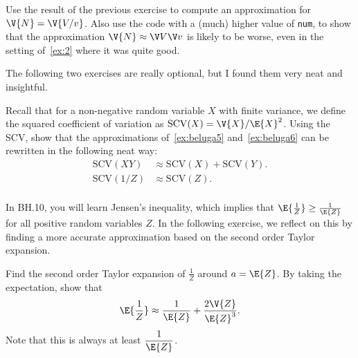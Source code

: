 \begin{exercise} Use the result of the previous exercise to compute an approximation for $\V {N}  = \V {V/v}$. Also use the code with a (much) higher value of \texttt{num}, to show that the approximation $\V {N}  \approx \V V \V v$ is likely to be worse, even in the setting of~\cref{ex:2} where it was quite good.
\end{exercise}

The following two exercises are really optional, but I found them very neat and insightful.



\begin{exercise}
Recall that for a non-negative random variable $X$ with finite variance, we define the squared coefficient of variation as $ \mathrm{SCV}(X) = \V {X} /\E {X}^2$.
Using the SCV, show that the approximations of~\cref{ex:beluga5} and~\cref{ex:beluga6} can be rewritten in the following neat way:
\begin{align*}
\mathrm{SCV}(XY) &\approx \mathrm{SCV}(X) + \mathrm{SCV}(Y). \\
\mathrm{SCV}\left(1/Z \right) &\approx \mathrm{SCV}(Z). \\
\end{align*}
\end{exercise}


In BH.10, you will learn Jensen's inequality, which implies that $\E{\frac{1}{Z}} \geq \frac{1}{\E{Z}}$ for all positive random variables $Z$. In the following exercise, we reflect on this by finding a more accurate approximation based on the second order Taylor expansion.

\begin{exercise} Find the second order Taylor expansion of $\frac{1}{Z}$ around $a=  \E {Z}$.
By taking the expectation, show that
\begin{align*}
\E{\frac{1}{Z}} \approx \frac{1}{\E{Z}} + \frac{2\V{Z}}{\E{Z}^3}.
\end{align*}
Note that this is always at least $\dfrac{1}{\E{Z}}$.
\end{exercise}
